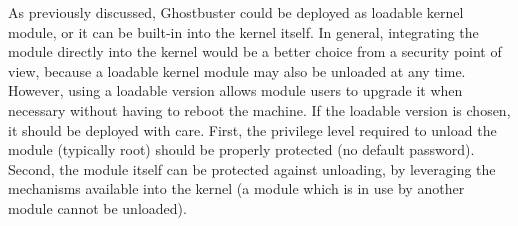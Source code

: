 As previously discussed, Ghostbuster could be deployed as loadable kernel module, or it can be built-in into the kernel itself.
In general, integrating the module directly into the kernel would be a better choice from a security point of view,
because a loadable kernel module may also be unloaded at any time. However, using a loadable version allows module users to upgrade it
when necessary without having to reboot the machine.
If the loadable version is chosen, it should be deployed with care. First, the privilege level required to unload the module (typically root) should be properly protected
(\eg no default password). Second, the module itself can be protected against unloading, by leveraging the mechanisms available into the kernel
(\eg a module which is in use by another module cannot be unloaded).

